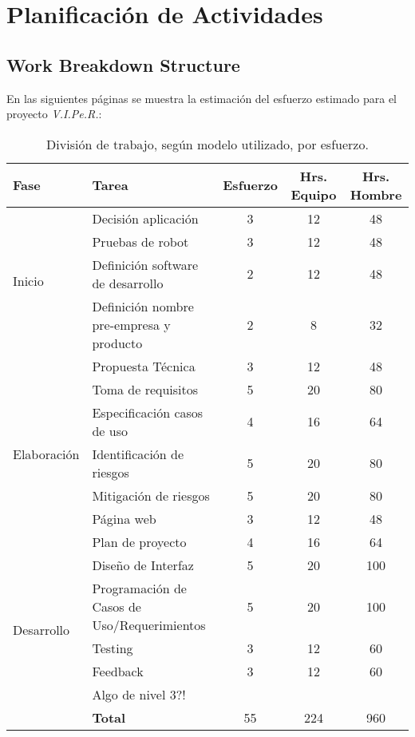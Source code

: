 \appendix
\addappheadtotoc
\appendixpage

\chapter{Planificaci\'on de Actividades}
\label{appen:planificacion}

\newpage
\section[WBS]{Work Breakdown Structure}
\label{section:wbs}

En las siguientes p\'aginas se muestra la estimaci\'on del esfuerzo estimado para el proyecto \emph{V.I.Pe.R.}:

\begin{table}[H]
  \centering
  \begin{tabular}{|l|m{5cm}|c|c|c|}\hline
    {\bf Fase} & {\bf Tarea} & {\bf Esfuerzo} & {\bf Hrs. Equipo} & {\bf Hrs. Hombre}\\\hline
    \multirow{4}{*}{Inicio} & Decisi\'on aplicaci\'on                & 3 & 12 & 48\\\cline{2-5}
           & Pruebas de robot                   & 3 & 12 & 48\\\cline{2-5}
           & Definici\'on software de desarrollo  & 2 & 12 & 48\\\cline{2-5}
           & Definici\'on nombre pre-empresa y producto & 2 & 8 & 32\\\hline
    \multirow{7}{*}{Elaboraci\'on} & Propuesta T\'ecnica           & 3 & 12 & 48\\\cline{2-5}
                & Toma de requisitos          & 5 & 20 & 80\\\cline{2-5}
                & Especificaci\'on casos de uso & 4 & 16 & 64\\\cline{2-5}
                & Identificaci\'on de riesgos   & 5 & 20 & 80\\\cline{2-5}
                & Mitigaci\'on de riesgos       & 5 & 20 & 80\\\cline{2-5}
                & P\'agina web                  & 3 & 12 & 48\\\cline{2-5}
                & Plan de proyecto            & 4 & 16 & 64\\\hline
    \multirow{5}{*}{Desarrollo} & Dise\~no de Interfaz                            & 5 & 20 & 100\\\cline{2-5}
               & Programaci\'on de Casos de Uso/Requerimientos   & 5 & 20 & 100\\\cline{2-5}
               & Testing                                       & 3 & 12 & 60\\\cline{2-5}
               & Feedback                                      & 3 & 12 & 60\\\cline{2-5}
               & Algo de nivel 3?!                             &   &    &\\\hline
                & {\bf Total}                 & 55 & 224 & 960\\\hline
  \end{tabular}
  \label{tab:wbs}
  \caption[~Tabla WBS]{Divisi\'on de trabajo, seg\'un modelo utilizado, por esfuerzo.}
\end{table}

